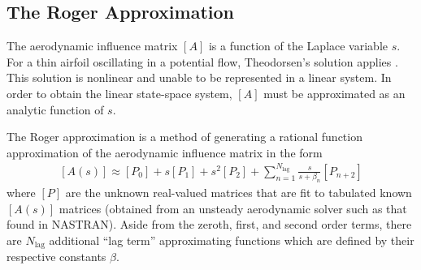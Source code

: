 \subsection{The Roger Approximation} %

The aerodynamic influence matrix $[A]$ is a function of the Laplace variable $s$. For a thin airfoil oscillating in a potential flow, Theodorsen's solution applies \cite{Theodorsen1949}. This solution is nonlinear and unable to be represented in a linear system. In order to obtain the linear state-space system, $[A]$ must be approximated as an analytic function of $s$.

The Roger approximation \cite{Roger1977} is a method of generating a rational function approximation of the aerodynamic influence matrix in the form
\begin{align}
	\label{eq:RogerApprox}
    [A(s)] \approx [P_0] + s [P_1] + s^2 [P_2] + \sum_{n=1}^{N_\text{lag}} \frac{s}{s+\beta_n} [P_{n+2}]
\end{align}
where $[P]$ are the unknown real-valued matrices that are fit to tabulated known $[A(s)]$ matrices (obtained from an unsteady aerodynamic solver such as that found in NASTRAN). Aside from the zeroth, first, and second order terms, there are $N_\text{lag}$ additional ``lag term'' approximating functions which are defined by their respective constants $\beta$.

